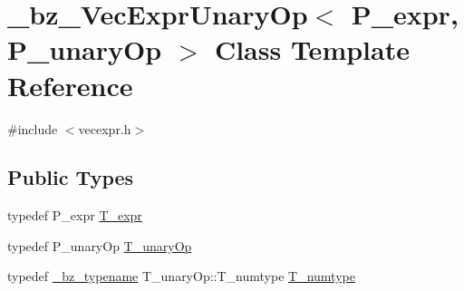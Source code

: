\hypertarget{class__bz__VecExprUnaryOp}{}\section{\+\_\+bz\+\_\+\+Vec\+Expr\+Unary\+Op$<$ P\+\_\+expr, P\+\_\+unary\+Op $>$ Class Template Reference}
\label{class__bz__VecExprUnaryOp}


{\ttfamily \#include $<$vecexpr.\+h$>$}

\subsection*{Public Types}
\begin{DoxyCompactItemize}
\item 
typedef P\+\_\+expr \hyperlink{class__bz__VecExprUnaryOp_a548e39ca3d7cd9ac4613ca52d665aeb2}{T\+\_\+expr}
\item 
typedef P\+\_\+unary\+Op \hyperlink{class__bz__VecExprUnaryOp_a2cd4ec9646af49a1cf41d940a7570130}{T\+\_\+unary\+Op}
\item 
typedef \hyperlink{compiler_8h_a1bc40add3e72effc9cf69dbe445cbdfd}{\+\_\+bz\+\_\+typename} T\+\_\+unary\+Op\+::\+T\+\_\+numtype \hyperlink{class__bz__VecExprUnaryOp_acb8a38cc50c0d7ceb35a1f81e5ff9e8c}{T\+\_\+numtype}
\end{DoxyCompactItemize}
